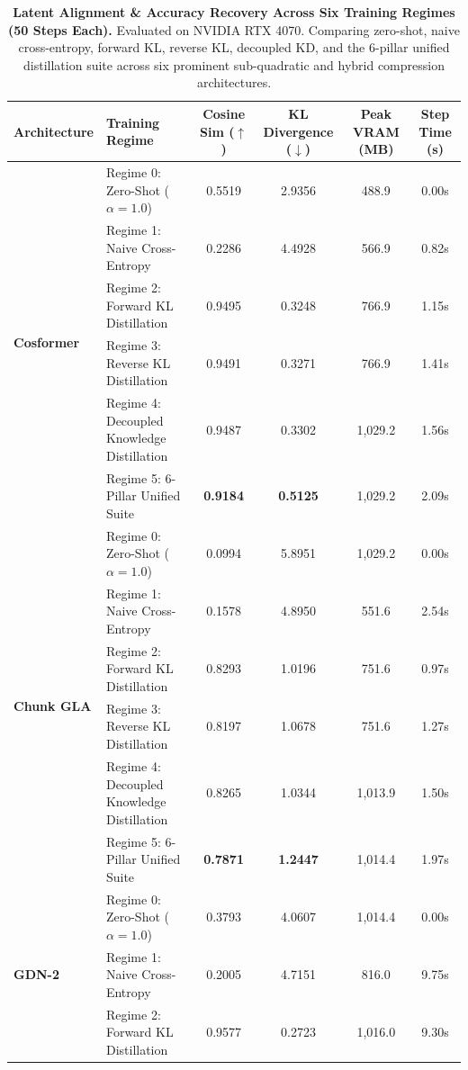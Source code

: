 \begin{table}[t]
\centering
\caption{\textbf{Latent Alignment \& Accuracy Recovery Across Six Training Regimes (50 Steps Each).}
Evaluated on NVIDIA RTX 4070. Comparing zero-shot, naive cross-entropy, forward KL, reverse KL, decoupled KD, and the 6-pillar unified distillation suite across six prominent sub-quadratic and hybrid compression architectures.}
\label{tab:kd_regimes}
\scriptsize
\setlength{\tabcolsep}{4.2pt}
\begin{tabular}{llcccc}
\toprule
\textbf{Architecture} & \textbf{Training Regime} & \textbf{Cosine Sim ($\uparrow$)} & \textbf{KL Divergence ($\downarrow$)} & \textbf{Peak VRAM (MB)} & \textbf{Step Time (s)} \\
\midrule
\multirow{6}{*}{\textbf{Cosformer}} & Regime 0: Zero-Shot ($\alpha=1.0$) & 0.5519 & 2.9356 & 488.9 & 0.00s \\
 & Regime 1: Naive Cross-Entropy & 0.2286 & 4.4928 & 566.9 & 0.82s \\
 & Regime 2: Forward KL Distillation & 0.9495 & 0.3248 & 766.9 & 1.15s \\
 & Regime 3: Reverse KL Distillation & 0.9491 & 0.3271 & 766.9 & 1.41s \\
 & Regime 4: Decoupled Knowledge Distillation & 0.9487 & 0.3302 & 1,029.2 & 1.56s \\
 & Regime 5: 6-Pillar Unified Suite & \textbf{0.9184} & \textbf{0.5125} & 1,029.2 & 2.09s \\
\midrule
\multirow{6}{*}{\textbf{Chunk GLA}} & Regime 0: Zero-Shot ($\alpha=1.0$) & 0.0994 & 5.8951 & 1,029.2 & 0.00s \\
 & Regime 1: Naive Cross-Entropy & 0.1578 & 4.8950 & 551.6 & 2.54s \\
 & Regime 2: Forward KL Distillation & 0.8293 & 1.0196 & 751.6 & 0.97s \\
 & Regime 3: Reverse KL Distillation & 0.8197 & 1.0678 & 751.6 & 1.27s \\
 & Regime 4: Decoupled Knowledge Distillation & 0.8265 & 1.0344 & 1,013.9 & 1.50s \\
 & Regime 5: 6-Pillar Unified Suite & \textbf{0.7871} & \textbf{1.2447} & 1,014.4 & 1.97s \\
\midrule
\multirow{6}{*}{\textbf{GDN-2}} & Regime 0: Zero-Shot ($\alpha=1.0$) & 0.3793 & 4.0607 & 1,014.4 & 0.00s \\
 & Regime 1: Naive Cross-Entropy & 0.2005 & 4.7151 & 816.0 & 9.75s \\
 & Regime 2: Forward KL Distillation & 0.9577 & 0.2723 & 1,016.0 & 9.30s \\

\end{tabular}
\end{table}

